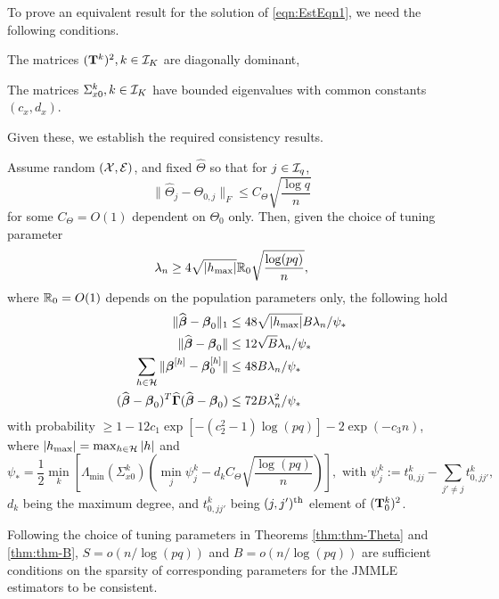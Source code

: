 To prove an equivalent result for the solution of \eqref{eqn:EstEqn1}, we need the following conditions.

\vspace{1em}
 The matrices $({\mathbf{T}}^k)^2, k \in {\cal{I}}_K$ are diagonally dominant,

 The matrices $\Sigma_{x0}^k, k \in {\cal{I}}_K$ have bounded eigenvalues with common constants $(c_x, d_x)$.
\vspace{1em}
%

\noindent Given these, we establish the required consistency results.

\begin{Theorem}\label{thm:thm-B}
Assume random $({\cal{X}}, {\cal{E}})$, and fixed $\widehat \Theta$ so that for $j \in {\cal{I}}_q$,
%
\[
\| \widehat \Theta_j - \Theta_{0,j} \|_F \leq C_\Theta \sqrt{\frac{\log q}{n}}
\]
%
for some $C_\Theta = O(1)$ dependent on $\Theta_0$ only. Then, given the choice of tuning parameter
%
$$
\lambda_n \geq 4 \sqrt{| h_{\max} |} {\mathbb{R}}_0 \sqrt{ \frac{ \log(pq)}{n}},
$$
%
where ${\mathbb{R}}_0 = O(1)$ depends on the population parameters only, the following hold
%
\begin{align}
\| \widehat {{\boldsymbol{\beta}}} - {\boldsymbol{\beta}}_0 \|_1 & \leq 48 \sqrt{ | h_{\max} |} B \lambda_n / \psi_* \label{eqn:BetaThmEqn1}\\
\| \widehat {{\boldsymbol{\beta}}} - {\boldsymbol{\beta}}_0 \| & \leq 12 \sqrt B \lambda_n / \psi_* \label{eqn:BetaThmEqn2}\\
\sum_{h \in {\cal{H}}} \| {\boldsymbol{\beta}}^{[h]} - {\boldsymbol{\beta}}_0^{[h]} \| & \leq 48 B \lambda_n / \psi_* \label{eqn:BetaThmEqn3}\\
(\widehat {{\boldsymbol{\beta}}} - {\boldsymbol{\beta}}_0 )^T \widehat {{\boldsymbol{\Gamma}}} (\widehat {{\boldsymbol{\beta}}} - {\boldsymbol{\beta}}_0 ) & \leq
72 B \lambda_n^2 / \psi_* \label{eqn:BetaThmEqn4}
\end{align}
%
with probability $\geq 1 - 12 c_1 \exp[-(c_2^2-1) \log(pq)] - 2 \exp( -c_3 n)$, where $|h_{\max}| = \max_{h \in {\cal{H}}} |h|$ and
%
$$
\psi_*= \frac{1}{2} \min_k \left[ \Lambda_{\min} (\Sigma_{x 0}^k) \left( \min_j \psi_j^k - d_k C_\Theta
\sqrt{ \frac{\log (pq)}{n}} \right) \right],
\text{ with }
\psi_j^k := t_{0,jj}^k - \sum_{j' \neq j} t_{0,jj'}^k,
$$
%
$d_k$ being the maximum degree, and $t_{0,jj'}^k$ being $(j,j'){\operatorname*{^{\text{th}}}}$ element of $({\mathbf{T}}_0^k)^2$.
\end{Theorem}

Following the choice of tuning parameters in Theorems \ref{thm:thm-Theta} and \ref{thm:thm-B}, $S = o(n/\log (pq))$ and $B = o(n/\log (pq))$ are sufficient conditions on the sparsity of corresponding parameters for the JMMLE estimators to be consistent.

